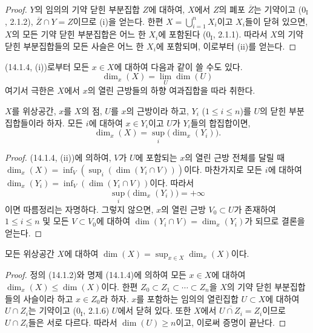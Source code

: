 \begin{proof}
$Y$의 임의의 기약 닫힌 부분집합 $Z$에 대하여, $X$에서 $Z$의 폐포
$\overline Z$는 기약이고 ($0_{\mathrm I}$, 2.1.2),
$\overline Z\cap Y=Z$이므로 (i)을 얻는다. 한편
$X=\bigcup_{i=1}^n X_i$이고 $X_i$들이 닫혀 있으면, $X$의 모든 기약
닫힌 부분집합은 어느 한 $X_i$에 포함된다 ($0_{\mathrm I}$, 2.1.1).
따라서 $X$의 기약 닫힌 부분집합들의 모든 사슬은 어느 한 $X_i$에
포함되며, 이로부터 (ii)를 얻는다.
\end{proof}

(14.1.4, (i))로부터 모든 $x\in X$에 대하여 다음과 같이 쓸 수도 있다.
\[
  \dim_x(X)=\lim_U\dim(U)
  \tag{14.1.4.1}\label{0.14.1.4.1-fr}
\]
여기서 극한은 $X$에서 $x$의 열린 근방들의 하향 여과집합을 따라
취한다.

\begin{corollary}[14.1.5]
\label{0.14.1.5-fr}
$X$를 위상공간, $x$를 $X$의 점, $U$를 $x$의 근방이라 하고,
$Y_i$ ($1\leq i\leq n$)를 $U$의 닫힌 부분집합들이라 하자. 모든 $i$에
대하여 $x\in Y_i$이고 $U$가 $Y_i$들의 합집합이면,
\[
  \dim_x(X)=\sup_i\bigl(\dim_x(Y_i)\bigr).
  \tag{14.1.5.1}\label{0.14.1.5.1-fr}
\]
\end{corollary}

\begin{proof}
(14.1.4, (ii))에 의하여, $V$가 $U$에 포함되는 $x$의 열린 근방
전체를 달릴 때
$\dim_x(X)=\inf_V(\sup_i(\dim(Y_i\cap V)))$이다. 마찬가지로 모든
$i$에 대하여 $\dim_x(Y_i)=\inf_V(\dim(Y_i\cap V))$이다. 따라서
\[
  \sup_i\bigl(\dim_x(Y_i)\bigr)=+\infty
\]
이면 따름정리는 자명하다. 그렇지 않으면, $x$의 열린 근방
$V_0\subset U$가 존재하여 $1\leq i\leq n$ 및 모든 $V\subset V_0$에
대하여 $\dim(Y_i\cap V)=\dim_x(Y_i)$가 되므로 결론을 얻는다.
\end{proof}

\begin{proposition}[14.1.6]
\label{0.14.1.6-fr}
모든 위상공간 $X$에 대하여
$\dim(X)=\sup_{x\in X}\dim_x(X)$이다.
\end{proposition}

\begin{proof}
정의 (14.1.2)와 명제 (14.1.4)에 의하여 모든 $x\in X$에 대하여
$\dim_x(X)\leq\dim(X)$이다. 한편
$Z_0\subset Z_1\subset\cdots\subset Z_n$을 $X$의 기약 닫힌
부분집합들의 사슬이라 하고 $x\in Z_0$라 하자. $x$를 포함하는 임의의
열린집합 $U\subset X$에 대하여 $U\cap Z_i$는 기약이고
($0_{\mathrm I}$, 2.1.6) $U$에서 닫혀 있다. 또한 $X$에서
$\overline{U\cap Z_i}=Z_i$이므로 $U\cap Z_i$들은 서로 다르다.
따라서 $\dim(U)\geq n$이고, 이로써 증명이 끝난다.
\end{proof}

